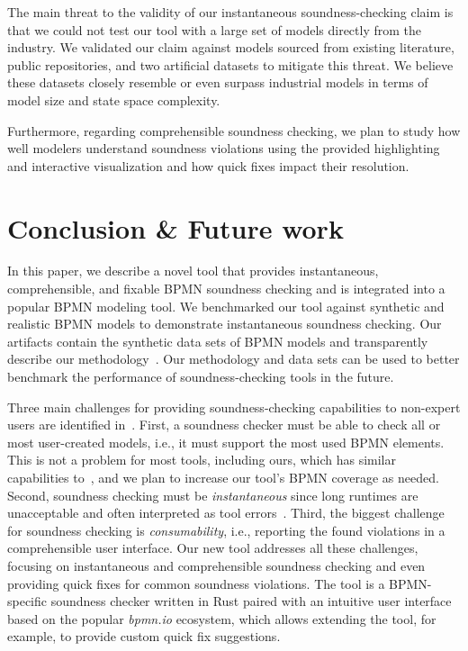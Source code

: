 \documentclass[runningheads]{llncs}
\begin{document}
The main threat to the validity of our instantaneous soundness-checking claim is that we could not test our tool with a large set of models directly from the industry.
We validated our claim against models sourced from existing literature, public repositories, and two artificial datasets to mitigate this threat.
We believe these datasets closely resemble or even surpass industrial models in terms of model size and state space complexity.

Furthermore, regarding comprehensible soundness checking, we plan to study how well modelers understand soundness violations using the provided highlighting and interactive visualization and how quick fixes impact their resolution.

\section{Conclusion \& Future work} \label{sec:conclusion}
In this paper, we describe a novel tool that provides instantaneous, comprehensible, and fixable BPMN soundness checking and is integrated into a popular BPMN modeling tool.
We benchmarked our tool against synthetic and realistic BPMN models to demonstrate instantaneous soundness checking.
Our artifacts contain the synthetic data sets of BPMN models and transparently describe our methodology~\cite{noauthorgivenBPM2024Artifacts2024}.
Our methodology and data sets can be used to better benchmark the performance of soundness-checking tools in the future.

Three main challenges for providing soundness-checking capabilities to non-expert users are identified in~\cite{fahlandAnalysisDemandInstantaneous2011}.
First, a soundness checker must be able to check all or most user-created models, i.e., it must support the most used BPMN elements.
This is not a problem for most tools, including ours, which has similar capabilities to~\cite{corradiniFormalApproachAnalysis2021}, and we plan to increase our tool's BPMN coverage as needed.
Second, soundness checking must be \textit{instantaneous} since long runtimes are unacceptable and often interpreted as tool errors~\cite{fahlandAnalysisDemandInstantaneous2011}.
Third, the biggest challenge for soundness checking is \textit{consumability}, i.e., reporting the found violations in a comprehensible user interface.
Our new tool addresses all these challenges, focusing on instantaneous and comprehensible soundness checking and even providing quick fixes for common soundness violations.
The tool is a BPMN-specific soundness checker written in Rust paired with an intuitive user interface based on the popular \textit{bpmn.io} ecosystem, which allows extending the tool, for example, to provide custom quick fix suggestions.
\end{document}
